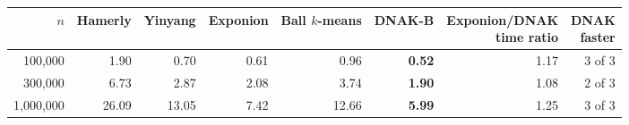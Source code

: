 \begin{tabular}{rrrrrrrr}
\toprule
$n$ & Hamerly & Yinyang & Exponion & Ball $k$-means & DNAK-B & \shortstack[r]{Exponion/DNAK\\ time ratio} & \shortstack[r]{DNAK\\ faster} \\
\midrule
100{,}000 & 1.90 & 0.70 & 0.61 & 0.96 & \textbf{0.52} & 1.17 & 3 of 3 \\
300{,}000 & 6.73 & 2.87 & 2.08 & 3.74 & \textbf{1.90} & 1.08 & 2 of 3 \\
1{,}000{,}000 & 26.09 & 13.05 & 7.42 & 12.66 & \textbf{5.99} & 1.25 & 3 of 3 \\
\bottomrule
\end{tabular}
